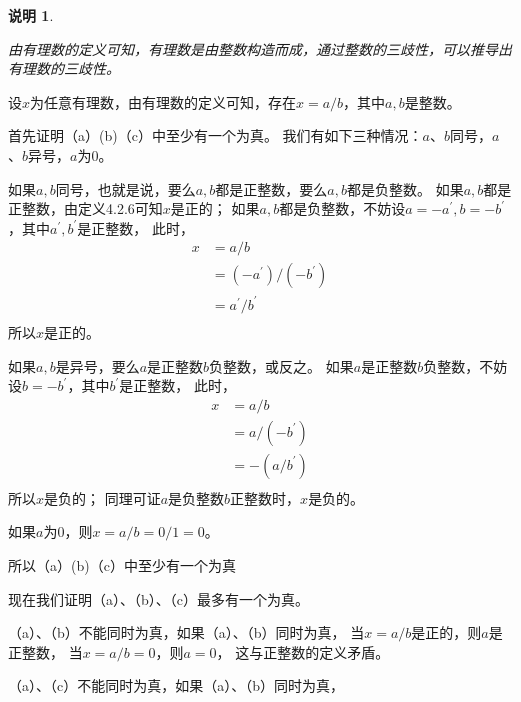 \documentclass{article}
\theoremstyle{mystyle}
\newtheorem*{zremark}{说明}
\begin{document}
\begin{zremark}
  \begin{zgraytheorem}
    由有理数的定义可知，有理数是由整数构造而成，通过整数的三歧性，可以推导出有理数的三歧性。
  \end{zgraytheorem}
\end{zremark}

设$x$为任意有理数，由有理数的定义可知，存在$x=a/b$，其中$a,b$是整数。

首先证明（a）(b)（c）中至少有一个为真。
我们有如下三种情况：$a$、$b$同号，$a$、$b$异号，$a$为0。

如果$a,b$同号，也就是说，要么$a,b$都是正整数，要么$a,b$都是负整数。
如果$a,b$都是正整数，由定义4.2.6可知$x$是正的；
如果$a,b$都是负整数，不妨设$a=-a^\prime, b=-b^\prime$，其中$a^\prime,b^\prime$是正整数，
此时，
\begin{align*}
  x & = a/b                       \\
    & = (-a^\prime) / (-b^\prime) \\
    & = a^\prime / b^\prime       \\
\end{align*}
所以$x$是正的。

如果$a,b$是异号，要么$a$是正整数$b$负整数，或反之。
如果$a$是正整数$b$负整数，不妨设$b=-b^\prime$，其中$b^\prime$是正整数，
此时，
\begin{align*}
  x & = a/b           \\
    & = a/(-b^\prime) \\
    & = -(a/b^\prime) \\
\end{align*}
所以$x$是负的；
同理可证$a$是负整数$b$正整数时，$x$是负的。

如果$a$为0，则$x=a/b=0/1=0$。

所以（a）(b)（c）中至少有一个为真

现在我们证明（a）、（b）、（c）最多有一个为真。

（a）、（b）不能同时为真，如果（a）、（b）同时为真，
当$x=a/b$是正的，则$a$是正整数，
当$x=a/b=0$，则$a=0$，
这与正整数的定义矛盾。

（a）、（c）不能同时为真，如果（a）、（b）同时为真，
\end{document}
